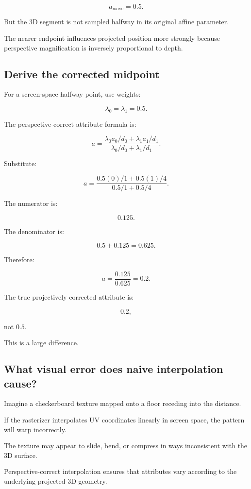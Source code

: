 \[
 \boxed{ a_{\mathrm{naive}}=0.5 }.
\]

But the 3D segment is not sampled halfway in its original affine parameter.

The nearer endpoint influences projected position more strongly because perspective magnification is inversely proportional to depth.

\subsection{Derive the corrected midpoint}\label{02-foundations-ii-ch034-derive-the-corrected-midpoint}

For a screen-space halfway point, use weights:

\[
 \lambda_0=\lambda_1=0.5.
\]

The perspective-correct attribute formula is:

\[
 a= \frac{ \lambda_0a_0/d_0+\lambda_1a_1/d_1 }{ \lambda_0/d_0+\lambda_1/d_1 }.
\]

Substitute:

\[
 a= \frac{ 0.5(0)/1+0.5(1)/4 }{ 0.5/1+0.5/4 }.
\]

The numerator is:

\[
 0.125.
\]

The denominator is:

\[
 0.5+0.125=0.625.
\]

Therefore:

\[
 \boxed{ a=\frac{0.125}{0.625}=0.2 }.
\]

The true projectively corrected attribute is:

\[
 \boxed{0.2},
\]

not \(0.5\).

This is a large difference.

\subsection{What visual error does naive interpolation cause?}\label{02-foundations-ii-ch034-what-visual-error-does-naive-interpolation-cause}

Imagine a checkerboard texture mapped onto a floor receding into the distance.

If the rasterizer interpolates UV coordinates linearly in screen space, the pattern will warp incorrectly.

The texture may appear to slide, bend, or compress in ways inconsistent with the 3D surface.

Perspective-correct interpolation ensures that attributes vary according to the underlying projected 3D geometry.


